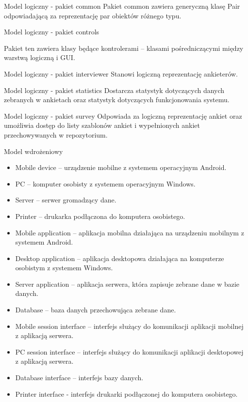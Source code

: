 \documentclass[a4paper,10pt]{beamer}
\begin{document}
	
	\begin{frame}{Model logiczny - pakiet common}
		Pakiet common zawiera generyczną klasę Pair odpowiadającą za reprezentację par obiektów różnego typu.
	\end{frame}
	\begin{frame}{Model logiczny - pakiet controls}
		
		Pakiet ten zawiera klasy będące kontrolerami – klasami pośredniczącymi między warstwą logiczną i GUI.
	\end{frame}
	
	\begin{frame}{Model logiczny - pakiet interviewer}
		Stanowi logiczną reprezentację ankieterów.
	\end{frame}
		\begin{frame}{Model logiczny - pakiet statistics}
			Dostarcza statystyk dotyczących danych zebranych w ankietach oraz statystyk dotyczących funkcjonowania systemu.
	\end{frame}
	\begin{frame}{Model logiczny - pakiet survey}
	Odpowiada za logiczną reprezentację ankiet oraz umożliwia dostęp do listy szablonów ankiet i wypełnionych ankiet przechowywanych w repozytorium.
\end{frame}
	
		\begin{frame}{Model wdrożeniowy}
		\end{frame}
		
		\begin{frame}
			\begin{itemize}
			\item Mobile device – urządzenie mobilne z systemem operacyjnym Android.
			\item PC – komputer osobisty z systemem operacyjnym Windows.
			\item Server – serwer gromadzący dane.
			\item Printer – drukarka podłączona do komputera osobistego.
			\item Mobile application – aplikacja mobilna działająca na urządzeniu mobilnym z systemem Android.
			\item Desktop application – aplikacja desktopowa działająca na komputerze osobistym z systemem Windows.
			\item Server application – aplikacja serwera, która zapisuje zebrane dane w bazie danych.
			\item Database – baza danych przechowująca zebrane dane.
			\item Mobile session interface – interfejs służący do komunikacji aplikacji mobilnej z aplikacją serwera.
			\item PC session interface – interfejs służący do komunikacji aplikacji desktopowej z aplikacją serwera.
			\item Database interface – interfejs bazy danych.
			\item Printer interface  - interfejs drukarki podłączonej do komputera osobistego.
		\end{itemize}
		\end{frame}
		
\end{document}
